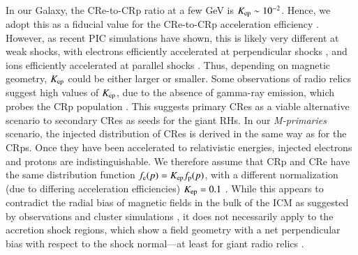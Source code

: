 \documentclass[fleqn,usenatbib,useAMS]{mnras}
\begin{document}
In our Galaxy, the CRe-to-CRp ratio at a few GeV is $K_{{\mathrm{ep}}} \sim
10^{-2}$. Hence, we adopt this as a fiducial value for the CRe-to-CRp
acceleration efficiency \citep[see][for more
  discussion]{pinzke13}. However, as recent PIC simulations have
shown, this is likely very different at weak shocks, with electrons
efficiently accelerated at perpendicular shocks
\citep{2014ApJ...794..153G,2014ApJ...797...47G}, and ions efficiently
accelerated at parallel shocks \citep{2014ApJ...783...91C}. Thus,
depending on magnetic geometry, $K_{{\mathrm{ep}}}$ could be either larger
or smaller. Some observations of radio relics suggest high values of
$K_{{\mathrm{ep}}}$, due to the absence of gamma-ray emission, which probes
the CRp population \citep{2014MNRAS.437.2291V}. This suggests primary
CRes as a viable alternative scenario to secondary CRes as seeds for
the giant RHs. In our {\em M-primaries} scenario, the injected
distribution of CRes is derived in the same way as for the CRps. Once
they have been accelerated to relativistic energies, injected
electrons and protons are indistinguishable. We therefore assume that
CRp and CRe have the same distribution function $f_{\mathrm{e}}(p) =
K_{\mathrm{ep}} f_{\mathrm{p}}(p)$, with a different normalization (due to
differing acceleration efficiencies) $K_{\mathrm{ep}}=0.1$ \citep[which is
  viable for primarily perpendicular
  shocks][]{2014ApJ...794..153G}. While this appears to contradict the
radial bias of magnetic fields in the bulk of the ICM as suggested by
observations \citep{2010NatPh...6..520P} and cluster simulations
\citep{2011ApJ...740...81R}, it does not necessarily apply to the
accretion shock regions, which show a field geometry with a net
perpendicular bias with respect to the shock normal---at least for
giant radio relics \citep{2010Sci...330..347V}.


\end{document}
